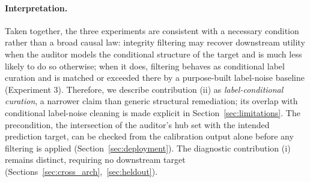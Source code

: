 \documentclass[pdflatex,sn-mathphys-num]{sn-jnl}
\theoremstyle{thmstyleone}%
\theoremstyle{thmstyletwo}%
\theoremstyle{thmstylethree}%
\begin{document}
\paragraph{Interpretation.} Taken together, the three experiments are consistent with a necessary condition rather than a broad causal law: integrity filtering may recover downstream utility when the auditor models the conditional structure of the target and is much less likely to do so otherwise; when it does, filtering behaves as conditional label curation and is matched or exceeded there by a purpose-built label-noise baseline (Experiment 3). Therefore, we describe contribution (ii) as \emph{label-conditional curation}, a narrower claim than generic structural remediation; its overlap with conditional label-noise cleaning is made explicit in Section~\ref{sec:limitations}. The precondition, the intersection of the auditor's hub set with the intended prediction target, can be checked from the calibration output alone before any filtering is applied (Section~\ref{sec:deployment}). The diagnostic contribution (i) remains distinct, requiring no downstream target (Sections~\ref{sec:cross_arch},~\ref{sec:heldout}).
\end{document}
